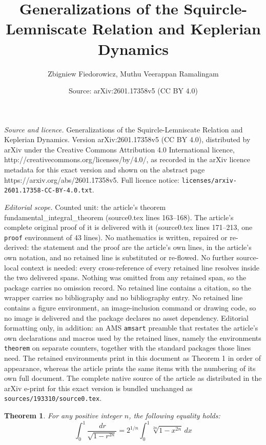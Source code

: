 \documentclass[10pt,a4paper]{amsart}
\title{Generalizations of the Squircle-Lemniscate Relation and Keplerian Dynamics}
\author{Zbigniew Fiedorowicz, Muthu Veerappan Ramalingam}
\date{Source: arXiv:2601.17358v5 (CC BY 4.0)}
\newtheorem{theorem}{Theorem}
\begin{document}
\maketitle

\noindent\emph{Source and licence.} Generalizations of the Squircle-Lemniscate Relation and Keplerian Dynamics. Version arXiv:2601.17358v5 (CC BY 4.0), distributed by arXiv under the Creative Commons Attribution 4.0 International licence, http://creativecommons.org/licenses/by/4.0/, as recorded in the arXiv licence metadata for this exact version and shown on the abstract page https://arxiv.org/abs/2601.17358v5. Full licence notice: \texttt{licenses/arxiv-2601.17358-CC-BY-4.0.txt}.\par\smallskip

\noindent\textit{Editorial scope.} Counted unit: the article's theorem fundamental\_integral\_theorem (source0.tex lines 163--168). The article's complete original proof of it is delivered with it (source0.tex lines 171--213, one \texttt{proof} environment of 43 lines). No mathematics is written, repaired or re-derived: the statement and the proof are the article's own lines, in the article's own notation, and no retained line is substituted or re-flowed.  No further source-local context is needed: every cross-reference of every retained line resolves inside the two delivered spans.  Nothing was omitted from any retained span, so the package carries no omission record.  No retained line contains a citation, so the wrapper carries no bibliography and no bibliography entry.  No retained line contains a figure environment, an image-inclusion command or drawing code, so no image is delivered and the package declares no asset dependency.  Editorial formatting only, in addition: an AMS \texttt{amsart} preamble that restates the article's own declarations and macros used by the retained lines, namely the environments \texttt{theorem} on separate counters, together with the standard packages those lines need.  The retained environments print in this document as Theorem 1 in order of appearance, whereas the article prints the same items with the numbering of its own full document.  The complete native source of the article as distributed in the arXiv e-print for this exact version is bundled unchanged as \texttt{sources/193310/source0.tex}.
\begin{theorem}\label{fundamental_integral_theorem}
For any positive integer $n$, the following equality holds:
\begin{equation}\label{fundamental_identity}
    \int_0^1 \frac{\,dr}{\sqrt{1-r^{2n}}} = 2^{1/n} \int_0^1 \sqrt[2n]{1-x^{2n}} \, dx
\end{equation}
\end{theorem}
\end{document}
